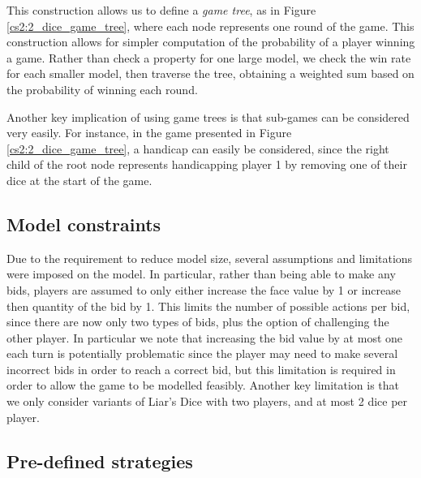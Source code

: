 This construction allows us to define a \emph{game tree}, as in Figure \ref{cs2:2_dice_game_tree}, where each node represents one round of the game. This construction allows for simpler computation of the probability of a player winning a game. Rather than check a property for one large model, we check the win rate for each smaller model, then traverse the tree, obtaining a weighted sum based on the probability of winning each round.

Another key implication of using game trees is that sub-games can be considered very easily. For instance, in the game presented in Figure \ref{cs2:2_dice_game_tree}, a handicap can easily be considered, since the right child of the root node represents handicapping player 1 by removing one of their dice at the start of the game.

\subsection{Model constraints}

Due to the requirement to reduce model size, several assumptions and limitations were imposed on the model. In particular, rather than being able to make any bids, players are assumed to only either increase the face value by 1 or increase then quantity of the bid by 1. This limits the number of possible actions per bid, since there are now only two types of bids, plus the option of challenging the other player. In particular we note that increasing the bid value by at most one each turn is potentially problematic since the player may need to make several incorrect bids in order to reach a correct bid, but this limitation is required in order to allow the game to be modelled feasibly.  Another key limitation is that we only consider variants of Liar's Dice with two players, and at most 2 dice per player.

\subsection{Pre-defined strategies}
\label{cs2:pre_def_strats}



